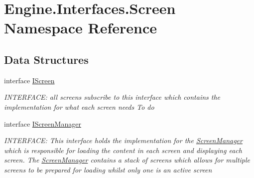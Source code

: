 \hypertarget{a00263}{}\section{Engine.\+Interfaces.\+Screen Namespace Reference}
\label{a00263}
\subsection*{Data Structures}
\begin{DoxyCompactItemize}
\item 
interface \hyperlink{a00466}{I\+Screen}
\begin{DoxyCompactList}\small\item\em I\+N\+T\+E\+R\+F\+A\+CE\+: all screens subscribe to this interface which contains the implementation for what each screen needs To do \end{DoxyCompactList}\item 
interface \hyperlink{a00470}{I\+Screen\+Manager}
\begin{DoxyCompactList}\small\item\em I\+N\+T\+E\+R\+F\+A\+CE\+: This interface holds the implementation for the \hyperlink{a00538}{Screen\+Manager} which is responsible for loading the content in each screen and displaying each screen. The \hyperlink{a00538}{Screen\+Manager} contains a stack of screens which allows for multiple screens to be prepared for loading whilst only one is an active screen \end{DoxyCompactList}\end{DoxyCompactItemize}
